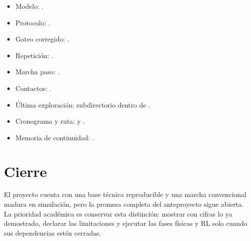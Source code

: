 \documentclass[11pt,letterpaper]{article}
\begin{document}
\begin{itemize}[leftmargin=*]
\item Modelo: .
\item Protocolo: .
\item Gateo corregido: .
\item Repetición: .
\item Marcha paso: .
\item Contactos: .
\item Última exploración: subdirectorio  dentro de .
\item Cronograma y ruta:  y .
\item Memoria de continuidad: .
\end{itemize}

\section*{Cierre}

El proyecto cuenta con una base técnica reproducible y una marcha convencional
madura en simulación, pero la promesa completa del anteproyecto sigue abierta.
La prioridad académica es conservar esta distinción: mostrar con cifras lo ya
demostrado, declarar las limitaciones y ejecutar las fases físicas y RL solo
cuando sus dependencias estén cerradas.
\end{document}
